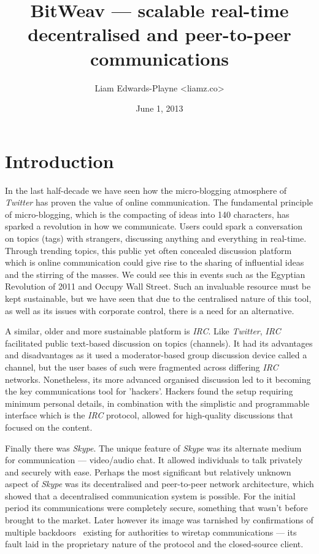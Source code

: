 \documentclass[10pt,a4paper,onecolumn]{article}
\author{Liam Edwards-Playne \textless liamz.co\textgreater}
\date{June 1, 2013}
\title{BitWeav — scalable real-time decentralised and peer-to-peer communications}
\begin{document}
\maketitle
\begin{abstract}
\end{abstract}

\section{Introduction}
\label{intro}
In the last half-decade we have seen how the micro-blogging atmosphere of \textit{Twitter} has proven the value of online communication. The fundamental principle of micro-blogging, which is the compacting of ideas into 140 characters, has sparked a revolution in how we communicate. Users could spark a conversation on topics (tags) with strangers, discussing anything and everything in real-time. Through trending topics, this public yet often concealed discussion platform which is online communication could give rise to the sharing of influential ideas and the stirring of the masses. We could see this in events such as the Egyptian Revolution of 2011 and Occupy Wall Street. Such an invaluable resource must be kept sustainable, but we have seen that due to the centralised nature of this tool, as well as its issues with corporate control, there is a need for an alternative. 

A similar, older and more sustainable platform is \textit{IRC}. Like \textit{Twitter}, \textit{IRC} facilitated public text-based discussion on topics (channels). It had its advantages and disadvantages as it used a moderator-based group discussion device called a channel, but the user bases of such were fragmented across differing \textit{IRC} networks. Nonetheless, its more advanced organised discussion led to it becoming the key communications tool for 'hackers'. Hackers found the setup requiring minimum personal details, in combination with the simplistic and programmable interface which is the \textit{IRC} protocol, allowed for high-quality discussions that focused on the content. 

Finally there was \textit{Skype}. The unique feature of \textit{Skype} was its alternate medium for communication — video/audio chat. It allowed individuals to talk privately and securely with ease. Perhaps the most significant but relatively unknown aspect of \textit{Skype} was its decentralised and peer-to-peer network architecture, which showed that a decentralised communication system is possible. For the initial period its communications were completely secure, something that wasn't before brought to the market. Later however its image was tarnished by confirmations of multiple backdoors~\cite{skypeBackdoor,skypeBackdoor2} existing for authorities to wiretap communications — its fault laid in the proprietary nature of the protocol and the closed-source client.
\end{document}
